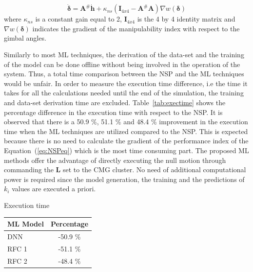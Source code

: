 \documentclass[aerospace,article,submit,moreauthors,dvi2pdf]{Definitions/mdpi}
\begin{document}
\begin{equation}
\label{eq:NSPeq}
     \dot{\boldsymbol{\delta}}=\textbf{A}^\# \dot{ \textbf{h}}+\kappa_{ns}(\textbf{I}_{4x4}-\textbf{A}^\#\textbf{A})\nabla w(\boldsymbol{\delta})
\end{equation}
where $\kappa_{ns}$ is a constant gain equal to 2, $\textbf{I}_{4x4}$ is the 4 by 4 identity matrix and $\nabla w(\boldsymbol{\delta})$ indicates the gradient of the manipulability index with respect to the gimbal angles.

Similarly to most ML techniques, the derivation of the data-set and the training of the model can be done offline without being involved in the operation of the system. Thus, a total time comparison between the NSP and the ML techniques would be unfair.  In order to measure the execution time difference, i.e the time it takes for all the calculations needed until the end of the simulation, the training and data-set derivation time are excluded. Table~\ref{tab:exectime} shows the percentage difference in the execution time with respect to the NSP. It is observed that there is a 50.9 \%, 51.1 \% and 48.4 \% improvement in the execution time when the ML techniques are utilized compared to the NSP. This is expected because there is no need to calculate the gradient of the performance index of the Equation~(\ref{eq:NSPeq}) which is the most time consuming part. The proposed ML methods offer the advantage of directly executing the null motion through commanding the $\textbf{L}$ set to the CMG cluster. No need of additional computational power is required since the model generation, the training and the predictions of $k_i$ values are executed a priori.

\begin{specialtable}[hbt!]
\caption{\label{tab:exectime} Execution time}
\begin{tabular}{lc}
\toprule
\textbf{ML Model}  &  \textbf{Percentage}   \\
\midrule
DNN &  -50.9 \%       \\
RFC 1 & -51.1 \%    \\
RFC 2 &  -48.4 \%     \\
\bottomrule
\end{tabular}
\end{specialtable}
\end{document}

